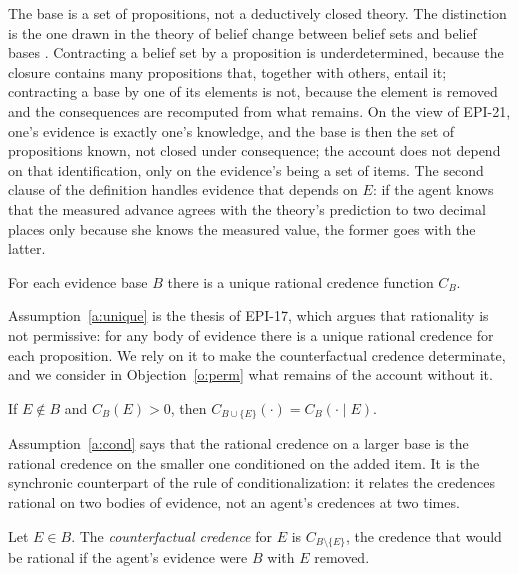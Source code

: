\documentclass{situationist-preprint}
\begin{document}
The base is a set of propositions, not a deductively closed theory. The distinction is the one drawn in the theory of belief change between belief sets and belief bases \citep{AGM1985,Hansson1999}. Contracting a belief set by a proposition is underdetermined, because the closure contains many propositions that, together with others, entail it; contracting a base by one of its elements is not, because the element is removed and the consequences are recomputed from what remains. On the view of EPI-21, one's evidence is exactly one's knowledge, and the base is then the set of propositions known, not closed under consequence; the account does not depend on that identification, only on the evidence's being a set of items. The second clause of the definition handles evidence that depends on $E$: if the agent knows that the measured advance agrees with the theory's prediction to two decimal places only because she knows the measured value, the former goes with the latter.

\begin{assumption}[Uniqueness]\label{a:unique}
For each evidence base $B$ there is a unique rational credence function $C_B$.
\end{assumption}

Assumption~\ref{a:unique} is the thesis of EPI-17, which argues that rationality is not permissive: for any body of evidence there is a unique rational credence for each proposition. We rely on it to make the counterfactual credence determinate, and we consider in Objection~\ref{o:perm} what remains of the account without it.

\begin{assumption}[Conditionalization]\label{a:cond}
If $E \notin B$ and $C_B(E) > 0$, then $C_{B \cup \{E\}}(\cdot) = C_B(\cdot \mid E)$.
\end{assumption}

Assumption~\ref{a:cond} says that the rational credence on a larger base is the rational credence on the smaller one conditioned on the added item. It is the synchronic counterpart of the rule of conditionalization: it relates the credences rational on two bodies of evidence, not an agent's credences at two times.

\begin{definition}\label{d:cf}
Let $E \in B$. The \emph{counterfactual credence} for $E$ is $C_{B \setminus \{E\}}$, the credence that would be rational if the agent's evidence were $B$ with $E$ removed.
\end{definition}
\end{document}
